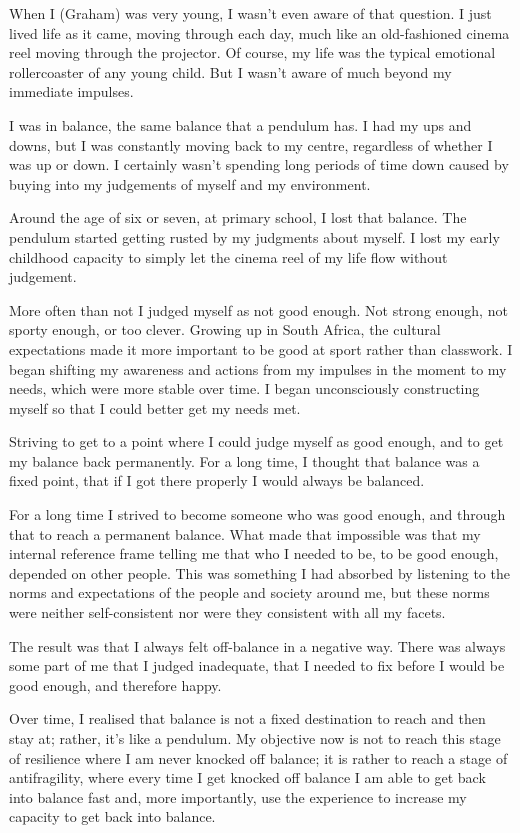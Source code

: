 \begin{longstoryblock}
When I (Graham) was very young, I wasn't even aware of that question. I just lived life as it came, moving through each day, much like an old-fashioned cinema reel moving through the projector. Of course, my life was the typical emotional rollercoaster of any young child. But I wasn't aware of much beyond my immediate impulses. 


I was in balance, the same balance that a pendulum has. I had my ups and downs, but I was constantly moving back to my centre, regardless of whether I was up or down. I certainly wasn't spending long periods of time down caused by buying into my judgements of myself and my environment.


Around the age of six or seven, at primary school, I lost that balance. The pendulum started getting rusted by my judgments about myself. I lost my early childhood capacity to simply let the cinema reel of my life flow without judgement.


More often than not I judged myself as not good enough. Not strong enough, not sporty enough, or too clever. Growing up in South Africa, the cultural expectations made it more important to be good at sport rather than classwork. I began shifting my awareness and actions from my impulses in the moment to my needs, which were more stable over time. I began unconsciously constructing myself so that I could better get my needs met.


Striving to get to a point where I could judge myself as good enough, and to get my balance back permanently. For a long time, I thought that balance was a fixed point, that if I got there properly I would always be balanced. 


For a long time I strived to become someone who was good enough, and through that to reach a permanent balance. What made that impossible was that my internal reference frame telling me that who I needed to be, to be good enough, depended on other people. This was something I had absorbed by listening to the norms and expectations of the people and society around me, but these norms were neither self-consistent nor were they consistent with all my facets. 


The result was that I always felt off-balance in a negative way. There was always some part of me that I judged inadequate, that I needed to fix before I would be good enough, and therefore happy.


Over time, I realised that balance is not a fixed destination to reach and then stay at; rather, it's like a pendulum. My objective now is not to reach this stage of resilience where I am never knocked off balance; it is rather to reach a stage of antifragility, where every time I get knocked off balance I am able to get back into balance fast and, more importantly, use the experience to increase my capacity to get back into balance.



\end{longstoryblock}
